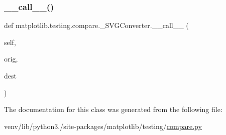 \subsubsection{\texorpdfstring{\+\_\+\+\_\+call\+\_\+\+\_\+()}{\_\_call\_\_()}}
{\footnotesize\ttfamily def matplotlib.\+testing.\+compare.\+\_\+\+S\+V\+G\+Converter.\+\_\+\+\_\+call\+\_\+\+\_\+ (\begin{DoxyParamCaption}\item[{}]{self,  }\item[{}]{orig,  }\item[{}]{dest }\end{DoxyParamCaption})}



The documentation for this class was generated from the following file\+:\begin{DoxyCompactItemize}
\item 
venv/lib/python3./site-\/packages/matplotlib/testing/\hyperlink{compare_8py}{compare.\+py}\end{DoxyCompactItemize}
